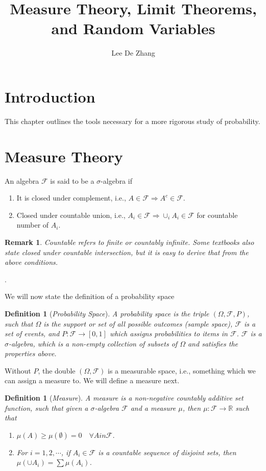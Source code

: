 \documentclass[10pt,a4paper]{article}
\author{Lee De Zhang}
\title{Measure Theory, Limit Theorems, and Random Variables}
\newtheorem{definition}[theorem]{Definition}
\numberwithin{equation}{subsection}
\newtheorem{remark}{Remark}
\begin{document}
\maketitle
\tableofcontents

\section{Introduction}
This chapter outlines the tools necessary for
a more rigorous study of probability. 

\section{Measure Theory}

An algebra $\mathcal{F}$ is said to be a $\sigma$-algebra
if
\begin{enumerate}
	\item It is closed under complement, i.e., $A \in \mathcal{F} \Rightarrow A^c \in \mathcal{F}$.
	\item Closed under countable union, i.e., $A_i \in \mathcal{F} \Rightarrow \cup_i A_i \in \mathcal{F}$ for
	countable number of $A_i$. 
\end{enumerate}
\begin{remark}
	Countable refers to finite or countably infinite.
	Some textbooks also state closed under countable 
	intersection, but it is easy to derive that 
	from the above conditions. 
\end{remark}.

We will now state the definition of a probability space

\begin{definition}[\emph{Probability Space}]

A probability space is the triple $(\Omega, \mathcal{F}, P)$,
such that $\Omega$ is the support or set of all possible
outcomes (sample space), $\mathcal{F}$ is a set of 
events, and $P:\mathcal{F}\rightarrow[0,1]$ which assigns
probabilities to items in $\mathcal{F}$. 
$\mathcal{F}$
is a $\sigma$-algebra, which is a non-empty collection 
of subsets of $\Omega$ and satisfies the properties above. 
\end{definition} 

Without $P$, the double $(\Omega, \mathcal{F})$ is a 
measurable space, i.e., something which we can
assign a measure to. We will define a measure next. 

\begin{definition}[\emph{Measure}]
A measure is a non-negative countably additive set
function, such that given a $\sigma$-algebra $\mathcal{F}$
and a measure $\mu$, then $\mu:\mathcal{F} \rightarrow 
\mathbb{R}$ such that
\begin{enumerate}
	\item $\mu(A) \geq \mu(\emptyset) = 0 \quad \forall A in \mathcal{F}$.
	\item For $i = 1, 2, \cdots$, if $A_i \in \mathcal{F}$ 
	is a countable
	sequence of disjoint sets, then $\mu(\cup A_i) = \sum \mu(A_i)$.
\end{enumerate}
\end{definition}
\end{document}
